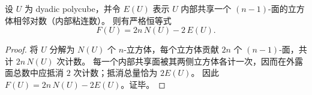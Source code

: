 \begin{proposition}[边界面数与内部粘连数的精确恒等式]\label{prop:spg-dyadic-polyclube-boundary-vs-adjacency-identity}
设 \(U\) 为 dyadic polycube，并令 \(E(U)\) 表示 \(U\) 内部共享一个 \((n-1)\)-面的立方体相邻对数（内部粘连数）。
则有严格恒等式
\[
F(U)=2n\,N(U)-2\,E(U).
\]
\end{proposition}
\begin{proof}
将 \(U\) 分解为 \(N(U)\) 个 \(n\)-立方体，每个立方体贡献 \(2n\) 个 \((n-1)\)-面，共计 \(2n\,N(U)\) 次计数。
每一个内部共享面被其两侧立方体各计一次，因而在外露面总数中应抵消 \(2\) 次计数；抵消总量恰为 \(2E(U)\)。
因此 \(F(U)=2n\,N(U)-2E(U)\)。证毕。
\end{proof}

\endinput
